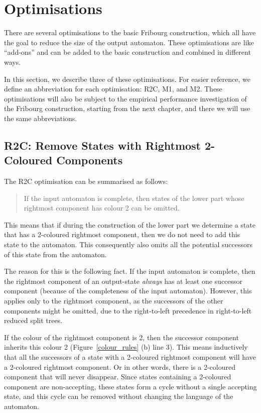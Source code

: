 \section{Optimisations}
\label{3_optimisations}
There are several optimisations to the basic Fribourg construction, which all have the goal to reduce the size of the output automaton. These optimisations are like ``add-ons'' and can  be added to the basic construction and combined in different ways.

In this section, we describe three of these optimisations. For easier reference, we define an abbreviation for each optimisation: R2C, M1, and M2. These optimisations will also be subject to the empirical performance investigation of the Fribourg construction, starting from the next chapter, and there we will use the same abbreviations.

\subsection{R2C: Remove States with Rightmost 2-Coloured Components}
The R2C optimisation can be summarised as follows:

\begin{quote}
If the input automaton is complete, then states of the lower part whose rightmost component has colour 2 can be omitted.
\end{quote}

This means that if during the construction of the lower part we determine a state that has a 2-coloured rightmost component, then we do not need to add this state to the automaton. This consequently also omits all the potential successors of this state from the automaton.

The reason for this is the following fact. If the input automaton is complete, then the rightmost component of an output-state \textit{always} has at least one successor component (because of the completeness of the input automaton). However, this applies only to the rightmost component, as the successors of the other components might be omitted, due to the right-to-left precedence in right-to-left reduced split trees.

If the colour of the rightmost component is 2, then the successor component inherits this colour 2 (Figure~\ref{colour_rules} (b) line 3). This means inductively that all the successors of a state with a 2-coloured rightmost component will have a 2-coloured rightmost component. Or in other words, there is a 2-coloured component that will never disappear. Since states containing a 2-coloured component are non-accepting, these states form a cycle without a single accepting state, and this cycle can be removed without changing the language of the automaton.

